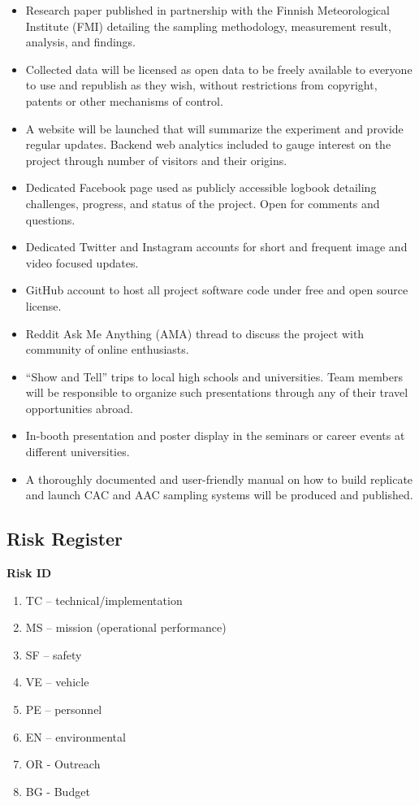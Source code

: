\documentclass[a4paper,12pt,twoside]{article}
\begin{document}
\begin{itemize}
\item Research paper published in partnership with the Finnish Meteorological Institute (FMI) detailing the sampling methodology, measurement result, analysis, and findings.
\item Collected data will be licensed as open data to be freely available to everyone to use and republish as they wish, without restrictions from copyright, patents or other mechanisms of control.
\item A website will be launched that will summarize the experiment and provide regular updates. Backend web analytics included to gauge interest on the project through number of visitors and their origins.
\item Dedicated Facebook page used as publicly accessible logbook detailing challenges, progress, and status of the project. Open for comments and questions.
\item Dedicated Twitter and Instagram accounts for short and frequent image and video focused updates.
\item GitHub account to host all project software code under free and open source license.
\item Reddit Ask Me Anything (AMA) thread to discuss the project with community of online enthusiasts.
\item\enquote{Show and Tell} trips to local high schools and universities. Team members will be responsible to organize such presentations through any of their travel opportunities abroad.
\item In-booth presentation and poster display in the seminars or career events at different universities. 
\item A thoroughly documented and user-friendly manual on how to build replicate and launch CAC and AAC sampling systems will be produced and published.
\end{itemize}
\pagebreak
\subsection{Risk Register}
\textbf{Risk ID}
\begin{enumerate}[label={}]
    \item TC – technical/implementation 
    \item MS – mission (operational performance) 
    \item SF – safety 
    \item VE – vehicle 
    \item PE – personnel 
    \item EN – environmental 
    \item OR - Outreach
    \item BG - Budget
\end{enumerate}
\end{document}
